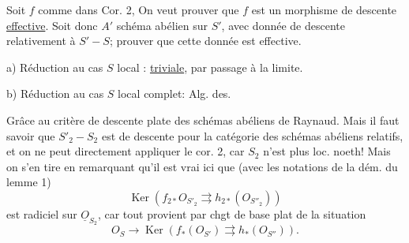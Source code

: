 Soit $f$ comme dans Cor. 2,  On veut prouver que $f$ est un morphisme de descente \uline{effective}. Soit donc $A'$ schéma abélien sur $S'$, avec donnée de descente relativement à $S'\mathbin{-}S$; prouver que cette donnée est effective.

a) Réduction au cas $S$ local : \uline{triviale}, par passage à la limite.

b) Réduction au cas $S$ local complet:  Alg. des.

Grâce au critère de descente plate des schémas abéliens de Raynaud. Mais il faut savoir que $S'_2\mathbin{-}S_2$ est  de descente pour la catégorie des schémas abéliens relatifs, et on ne peut directement appliquer le  cor. 2, car $S_2$ n'est plus loc. noeth! Mais on s'en tire en remarquant qu'il est vrai  ici que (avec les notations de la dém. du lemme 1)
\[
\operatorname{Ker}(f_{2*}O_{S'_2}\rightrightarrows h_{2*}(O_{S''_2}))
\]
est radiciel sur $\underline O_{S_2}$, car tout provient par chgt de base plat de la situation
\[
O_S\longrightarrow\operatorname{Ker}(f_*(O_{S'})\rightrightarrows h_*(O_{S''})).
\]

